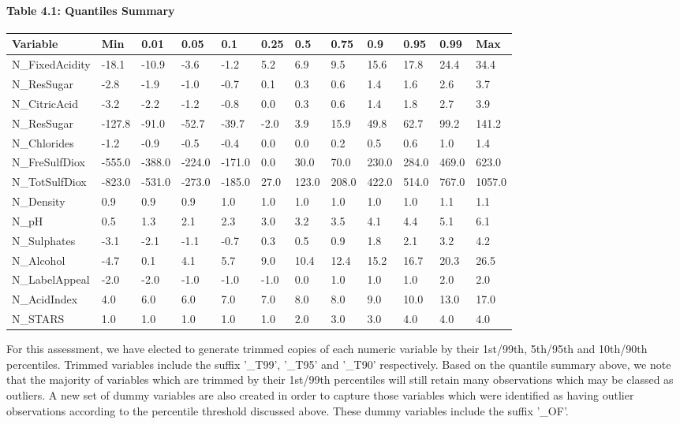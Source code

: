 \documentclass[]{article}
\let\oldparagraph\paragraph
\renewcommand{\paragraph}[1]{\oldparagraph{#1}\mbox{}}
\begin{document}
\paragraph{Table 4.1: Quantiles
Summary}\label{table-4.1-quantiles-summary}

\begin{longtable}[]{@{}llllllllllll@{}}
\toprule
Variable & Min & 0.01 & 0.05 & 0.1 & 0.25 & 0.5 & 0.75 & 0.9 & 0.95 &
0.99 & Max\tabularnewline
\midrule
\endhead
N\_FixedAcidity & -18.1 & -10.9 & -3.6 & -1.2 & 5.2 & 6.9 & 9.5 & 15.6 &
17.8 & 24.4 & 34.4\tabularnewline
N\_ResSugar & -2.8 & -1.9 & -1.0 & -0.7 & 0.1 & 0.3 & 0.6 & 1.4 & 1.6 &
2.6 & 3.7\tabularnewline
N\_CitricAcid & -3.2 & -2.2 & -1.2 & -0.8 & 0.0 & 0.3 & 0.6 & 1.4 & 1.8
& 2.7 & 3.9\tabularnewline
N\_ResSugar & -127.8 & -91.0 & -52.7 & -39.7 & -2.0 & 3.9 & 15.9 & 49.8
& 62.7 & 99.2 & 141.2\tabularnewline
N\_Chlorides & -1.2 & -0.9 & -0.5 & -0.4 & 0.0 & 0.0 & 0.2 & 0.5 & 0.6 &
1.0 & 1.4\tabularnewline
N\_FreSulfDiox & -555.0 & -388.0 & -224.0 & -171.0 & 0.0 & 30.0 & 70.0 &
230.0 & 284.0 & 469.0 & 623.0\tabularnewline
N\_TotSulfDiox & -823.0 & -531.0 & -273.0 & -185.0 & 27.0 & 123.0 &
208.0 & 422.0 & 514.0 & 767.0 & 1057.0\tabularnewline
N\_Density & 0.9 & 0.9 & 0.9 & 1.0 & 1.0 & 1.0 & 1.0 & 1.0 & 1.0 & 1.1 &
1.1\tabularnewline
N\_pH & 0.5 & 1.3 & 2.1 & 2.3 & 3.0 & 3.2 & 3.5 & 4.1 & 4.4 & 5.1 &
6.1\tabularnewline
N\_Sulphates & -3.1 & -2.1 & -1.1 & -0.7 & 0.3 & 0.5 & 0.9 & 1.8 & 2.1 &
3.2 & 4.2\tabularnewline
N\_Alcohol & -4.7 & 0.1 & 4.1 & 5.7 & 9.0 & 10.4 & 12.4 & 15.2 & 16.7 &
20.3 & 26.5\tabularnewline
N\_LabelAppeal & -2.0 & -2.0 & -1.0 & -1.0 & -1.0 & 0.0 & 1.0 & 1.0 &
1.0 & 2.0 & 2.0\tabularnewline
N\_AcidIndex & 4.0 & 6.0 & 6.0 & 7.0 & 7.0 & 8.0 & 8.0 & 9.0 & 10.0 &
13.0 & 17.0\tabularnewline
N\_STARS & 1.0 & 1.0 & 1.0 & 1.0 & 1.0 & 2.0 & 3.0 & 3.0 & 4.0 & 4.0 &
4.0\tabularnewline
\bottomrule
\end{longtable}

For this assessment, we have elected to generate trimmed copies of each
numeric variable by their 1st/99th, 5th/95th and 10th/90th percentiles.
Trimmed variables include the suffix '\_T99', '\_T95' and '\_T90'
respectively. Based on the quantile summary above, we note that the
majority of variables which are trimmed by their 1st/99th percentiles
will still retain many observations which may be classed as outliers. A
new set of dummy variables are also created in order to capture those
variables which were identified as having outlier observations according
to the percentile threshold discussed above. These dummy variables
include the suffix '\_OF'.
\end{document}
